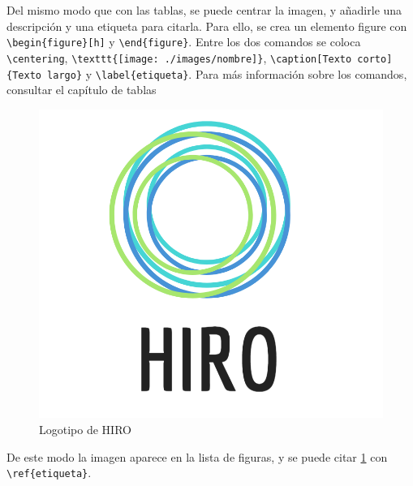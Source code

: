 Del mismo modo que con las tablas, se puede centrar la imagen, y añadirle una descripción y una etiqueta para citarla. Para ello, se crea un elemento figure con \verb!\begin{figure}[h]! y \verb!\end{figure}!. Entre los dos comandos se coloca \verb!\centering!, \verb!\texttt{[image: ./images/nombre]}!, \verb!\caption[Texto corto]{Texto largo}! y \verb!\label{etiqueta}!. Para más información sobre los comandos, consultar el capítulo de tablas

\begin{figure}[H]
	\centering
	\includegraphics[scale=0.25]{./images/HIRO}
	\caption[HIRO logo]{Logotipo de HIRO}
	\label{hiro_logo}
\end{figure}

De este modo la imagen aparece en la lista de figuras, y se puede citar \ref{hiro_logo} con \verb!\ref{etiqueta}!.